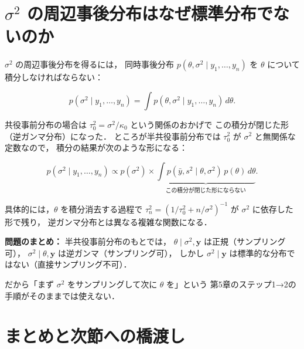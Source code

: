 \documentclass[lualatex,ja=standard,a4paper,12pt]{bxjsarticle}
\begin{document}
\section{$\sigma^2$ の周辺事後分布はなぜ標準分布でないのか}

$\sigma^2$ の周辺事後分布を得るには，
同時事後分布 $p(\theta, \sigma^2 \mid y_1, \ldots, y_n)$ を
$\theta$ について積分しなければならない：

\[
  p(\sigma^2 \mid y_1, \ldots, y_n)
  = \int p(\theta, \sigma^2 \mid y_1, \ldots, y_n)\,d\theta.
\]

共役事前分布の場合は $\tau_0^2 = \sigma^2/\kappa_0$ という関係のおかげで
この積分が閉じた形（逆ガンマ分布）になった．
ところが半共役事前分布では $\tau_0^2$ が $\sigma^2$ と無関係な定数なので，
積分の結果が次のような形になる：

\[
  p(\sigma^2 \mid y_1, \ldots, y_n)
  \propto
  p(\sigma^2) \times
  \underbrace{\int p(\bar{y}, s^2 \mid \theta, \sigma^2)\,p(\theta)\,d\theta}_{\text{この積分が閉じた形にならない}}.
\]

具体的には，$\theta$ を積分消去する過程で
$\tau_n^2 = (1/\tau_0^2 + n/\sigma^2)^{-1}$ が $\sigma^2$ に依存した形で残り，
逆ガンマ分布とは異なる複雑な関数になる．

\begin{warningbox}
\textbf{問題のまとめ：}
半共役事前分布のもとでは，
$\theta \mid \sigma^2, \boldsymbol{y}$ は正規（サンプリング可），
$\sigma^2 \mid \theta, \boldsymbol{y}$ は逆ガンマ（サンプリング可），
しかし $\sigma^2 \mid \boldsymbol{y}$ は標準的な分布ではない（直接サンプリング不可）．

\medskip
だから「まず $\sigma^2$ をサンプリングして次に $\theta$ を」という
第5章のステップ1→2の手順がそのままでは使えない．
\end{warningbox}

\section{まとめと次節への橋渡し}
\end{document}
